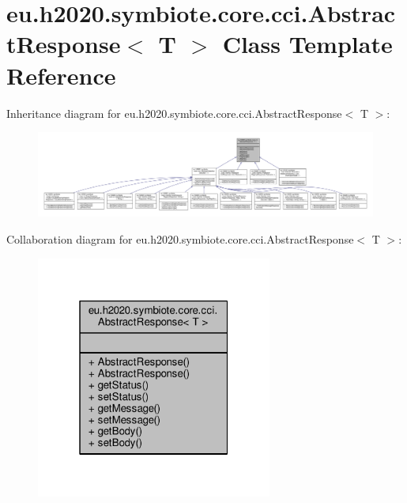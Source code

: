 \hypertarget{classeu_1_1h2020_1_1symbiote_1_1core_1_1cci_1_1AbstractResponse}{}\section{eu.\+h2020.\+symbiote.\+core.\+cci.\+Abstract\+Response$<$ T $>$ Class Template Reference}
\label{classeu_1_1h2020_1_1symbiote_1_1core_1_1cci_1_1AbstractResponse}


Inheritance diagram for eu.\+h2020.\+symbiote.\+core.\+cci.\+Abstract\+Response$<$ T $>$\+:
\nopagebreak
\begin{figure}[H]
\begin{center}
\leavevmode
\includegraphics[width=350pt]{classeu_1_1h2020_1_1symbiote_1_1core_1_1cci_1_1AbstractResponse__inherit__graph}
\end{center}
\end{figure}


Collaboration diagram for eu.\+h2020.\+symbiote.\+core.\+cci.\+Abstract\+Response$<$ T $>$\+:
\nopagebreak
\begin{figure}[H]
\begin{center}
\leavevmode
\includegraphics[width=220pt]{classeu_1_1h2020_1_1symbiote_1_1core_1_1cci_1_1AbstractResponse__coll__graph}
\end{center}
\end{figure}
